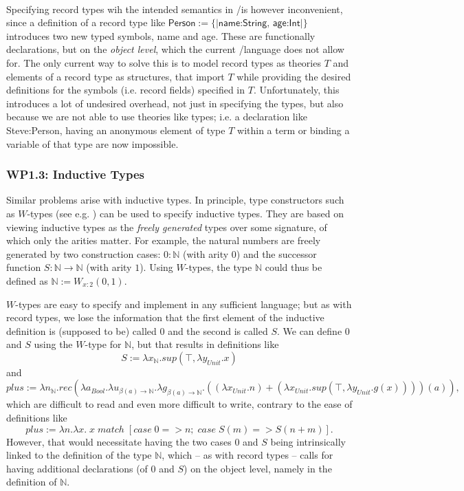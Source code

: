 \paragraph{}Specifying record types wih the intended semantics in \omdoc/\mmt is however inconvenient, since a definition of a record type like $\textsf{Person}:=\{|\textsf{name:String, age:Int}|\}$ introduces two new typed symbols, \textsf{name} and \textsf{age}. These are functionally declarations, but on the \emph{object level}, which the current \omdoc/\mmt language does not allow for. The only current way to solve this is to model record types as theories $T$ and elements of a record type as \mmt structures, that import $T$ while providing the desired definitions for the symbols (i.e. record fields) specified in $T$. Unfortunately, this introduces a lot of undesired overhead, not just in specifying the types, but also because we are not able to use theories like types; i.e. a declaration like
\textsf{Steve:Person}, having an anonymous element of type $T$ within a term or binding a variable of that type are now impossible.

\subsubsection{\textbf{WP1.3}: Inductive Types}
Similar problems arise with inductive types. In principle, type constructors such as $W$-types (see e.g. \cite{hottbook}) can be used to specify inductive types. They are based on viewing inductive types as the \emph{freely generated} types over some signature, of which only the arities matter. For example, the natural numbers are freely generated by two construction cases: $0:\mathbb N$ (with arity $0$) and the successor function $S:\mathbb N\to\mathbb N$ (with arity $1$). Using $W$-types, the type $\mathbb N$ could thus be defined as $\mathbb N :=W_{x:2}(0,1)$.

$W$-types are easy to specify and implement in any sufficient language; but as with record types, we lose the information that the first element of the inductive definition is (supposed to be) called $0$ and the second is called $S$. We can define $0$ and $S$ using the $W$-type for $\mathbb N$, but that results in definitions like
\[S:= \lambda x_{\mathbb N}.sup(\top,\lambda y_{Unit}.x)\]
and
\[ plus:=\lambda n_{\mathbb N}. rec\left( \lambda a_{Bool}.\lambda u_{\beta(a)\to\mathbb N}.\lambda g_{\beta(a)\to\mathbb N}.((\lambda x_{Unit}.n)+(\lambda x_{Unit}.sup(\top,\lambda y_{Unit}.g(x))))(a)\right),\]
which are difficult to read and even more difficult to write, contrary to the ease of definitions like
\[plus:= \lambda n.\lambda x.\; x\; match\; [case\; 0 => n;\;case\; S(m)=> S(n+m)].\]
However, that would necessitate having the two cases $0$ and $S$ being intrinsically linked to the definition of the type $\mathbb N$, which -- as with record types -- calls for having additional declarations (of $0$ and $S$) on the object level, namely in the definition of $\mathbb N$.

